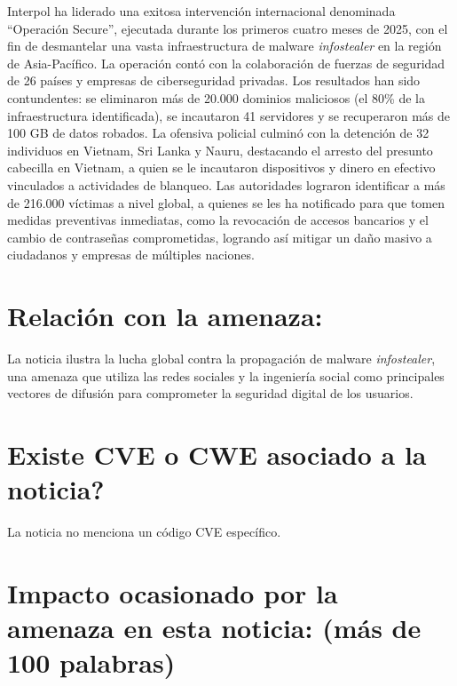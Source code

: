     Interpol ha liderado una exitosa intervención internacional denominada ``Operación Secure'', ejecutada durante los primeros cuatro meses de 2025, con el fin de desmantelar una vasta infraestructura de malware \textit{infostealer} en la región de Asia-Pacífico. La operación contó con la colaboración de fuerzas de seguridad de 26 países y empresas de ciberseguridad privadas. Los resultados han sido contundentes: se eliminaron más de 20.000 dominios maliciosos (el 80\% de la infraestructura identificada), se incautaron 41 servidores y se recuperaron más de 100 GB de datos robados. La ofensiva policial culminó con la detención de 32 individuos en Vietnam, Sri Lanka y Nauru, destacando el arresto del presunto cabecilla en Vietnam, a quien se le incautaron dispositivos y dinero en efectivo vinculados a actividades de blanqueo. Las autoridades lograron identificar a más de 216.000 víctimas a nivel global, a quienes se les ha notificado para que tomen medidas preventivas inmediatas, como la revocación de accesos bancarios y el cambio de contraseñas comprometidas, logrando así mitigar un daño masivo a ciudadanos y empresas de múltiples naciones.


    \section{Relación con la amenaza:}

    La noticia ilustra la lucha global contra la propagación de malware \textit{infostealer}, una amenaza que utiliza las redes sociales y la ingeniería social como principales vectores de difusión para comprometer la seguridad digital de los usuarios.

    \section{\textquestiondown Existe CVE o CWE asociado a la noticia?}
 
    La noticia no menciona un código CVE específico.

    \section{Impacto ocasionado por la amenaza en esta noticia: (más de 100 palabras)}


